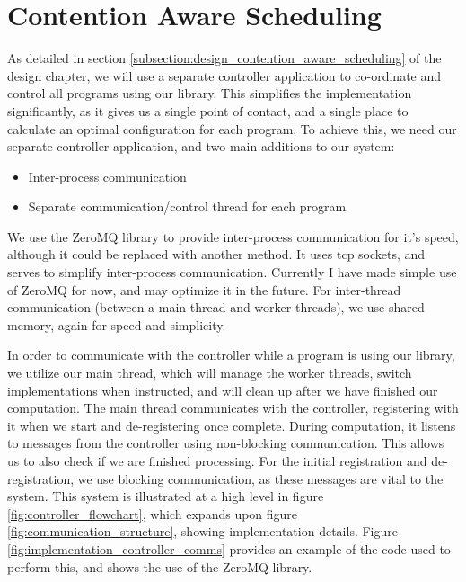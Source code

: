\section{Contention Aware Scheduling}
\label{section:implementation_contention_aware_scheduling}

As detailed in section \ref{subsection:design_contention_aware_scheduling} of the design chapter, we will use a separate controller application to co-ordinate and control all programs using our library. This simplifies the implementation significantly, as it gives us a single point of contact, and a single place to calculate an optimal configuration for each program. To achieve this, we need our separate controller application, and two main additions to our system:

\begin{itemize}
	\item Inter-process communication
	\item Separate communication/control thread for each program
\end{itemize}

We use the ZeroMQ library to provide inter-process communication for it's speed, although it could be replaced with another method. It uses tcp sockets, and serves to simplify inter-process communication. Currently I have made simple use of ZeroMQ for now, and may optimize it in the future. For inter-thread communication (between a main thread and worker threads), we use shared memory, again for speed and simplicity.

In order to communicate with the controller while a program is using our library, we utilize our main thread, which will manage the worker threads, switch implementations when instructed, and will clean up after we have finished our computation. The main thread communicates with the controller, registering with it when we start and de-registering once complete. During computation, it listens to messages from the controller using non-blocking communication. This allows us to also check if we are finished processing. For the initial registration and de-registration, we use blocking communication, as these messages are vital to the system. This system is illustrated at a high level in figure \ref{fig:controller_flowchart}, which expands upon figure \ref{fig:communication_structure}, showing implementation details. Figure \ref{fig:implementation_controller_comms} provides an example of the code used to perform this, and shows the use of the ZeroMQ library.



